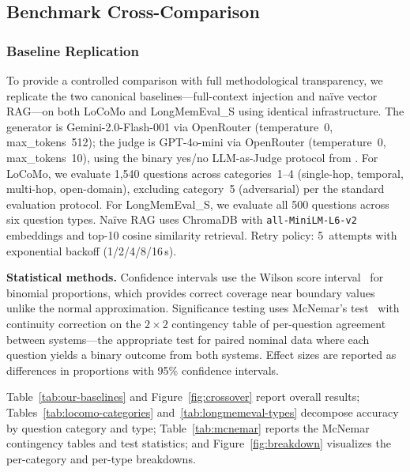 \subsection{Benchmark Cross-Comparison}
\label{sec:benchmark-cross-comparison}



\subsubsection{Baseline Replication}
\label{sec:baseline-replication}

To provide a controlled comparison with full methodological transparency, we
replicate the two canonical baselines---full-context injection and na\"ive
vector RAG---on both LoCoMo and LongMemEval\_S using identical infrastructure.
The generator is Gemini-2.0-Flash-001 via OpenRouter (temperature~0,
max\_tokens~512); the judge is GPT-4o-mini via OpenRouter (temperature~0,
max\_tokens~10), using the binary yes/no LLM-as-Judge protocol from
\cite{maharana2024locomo}.  For LoCoMo, we evaluate 1{,}540 questions across
categories~1--4 (single-hop, temporal, multi-hop, open-domain), excluding
category~5 (adversarial) per the standard evaluation protocol.  For
LongMemEval\_S, we evaluate all 500 questions across six question types.
Na\"ive RAG uses ChromaDB with \texttt{all-MiniLM-L6-v2} embeddings and
top-10 cosine similarity retrieval.  Retry policy: 5~attempts with
exponential backoff (1/2/4/8/16\,s).

\smallskip
\noindent\textbf{Statistical methods.}\enspace
Confidence intervals use the Wilson score interval~\cite{wilson1927} for
binomial proportions, which provides correct coverage near boundary values
unlike the normal approximation.  Significance testing uses McNemar's
test~\cite{mcnemar1947} with continuity correction on the $2 \times 2$
contingency table of per-question agreement between systems---the appropriate
test for paired nominal data where each question yields a binary outcome from
both systems.  Effect sizes are reported as differences in proportions with
95\% confidence intervals.

Table~\ref{tab:our-baselines} and Figure~\ref{fig:crossover} report overall
results; Tables~\ref{tab:locomo-categories} and~\ref{tab:longmemeval-types}
decompose accuracy by question category and type;
Table~\ref{tab:mcnemar} reports the McNemar contingency tables and test
statistics; and Figure~\ref{fig:breakdown} visualizes the per-category and
per-type breakdowns.

